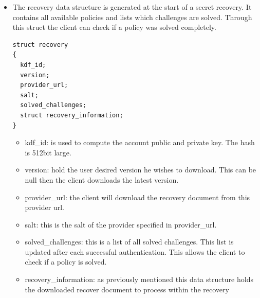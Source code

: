 \begin{itemize}
\item
The recovery data structure is generated at the start of a secret recovery. It contains all available policies and lists which challenges are solved. Through this
struct the client can check if a policy was solved completely.
\begin{lstlisting}
struct recovery
{
  kdf_id;
  version;
  provider_url;
  salt;
  solved_challenges;
  struct recovery_information;
}
\end{lstlisting}
\begin{itemize}
\item kdf\_id: is used to compute the account public and private key. The hash is 512bit large.
\item version: hold the user desired version he wishes to download. This can be null then the client downloads the latest version.
\item provider\_url: the client will download the recovery document from this provider url.
\item salt: this is the salt of the provider specified in provider\_url.
\item solved\_challenges: this is a list of all solved challenges. This list is updated after each successful authentication. This allows the client to check if a policy is solved.
\item recovery\_information: as previously mentioned this data structure holds the downloaded recover document to process within the recovery
\end{itemize}


\end{itemize}
